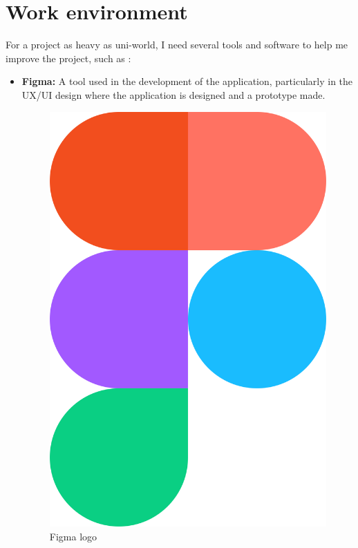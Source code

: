 \section{Work environment}
For a project as heavy as uni-world, I need several tools and software to help me improve the project, such as : \\
\begin{itemize}
    \item \textbf{Figma:} A tool used in the development of the application, particularly in the UX/UI 
    design where the application is designed and a prototype made.
        \begin{figure}[H] 
            \centering
            \includegraphics[scale=0.03]{logos/Figma-logo.png}
            \caption{Figma logo } 
            \label{fig: Figma logo}

\end{figure}
\end{itemize}
